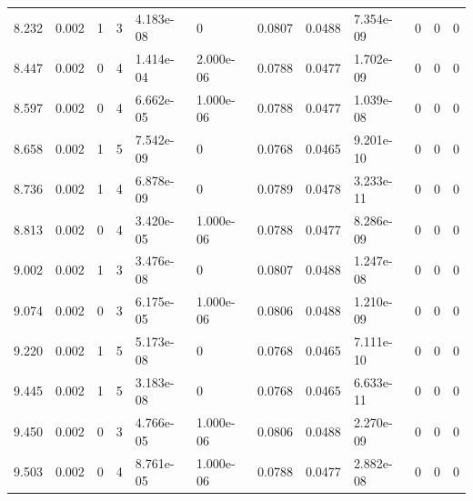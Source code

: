\documentclass[preview]{standalone}
\begin{document}
{{{\begin{tabular}{L{1.2cm}C{1.2cm} C{0.3cm}C{0.5cm} C{1.4cm}C{1.4cm} C{1.4cm}C{1.4cm} C{1.6cm}C{1.6cm} C{1.6cm}C{1.6cm}}
  8.232  &  0.002  & 1     &  3 &  4.183e-08  & 0  &  0.0807&   0.0488& 7.354e-09 & 0   &  0 & 0  \\ 
  8.447  &  0.002  & 0     &  4 &  1.414e-04  & 2.000e-06  &  0.0788&   0.0477& 1.702e-09 & 0   &  0 & 0  \\ 
  8.597  &  0.002  & 0     &  4 &  6.662e-05  & 1.000e-06  &  0.0788&   0.0477& 1.039e-08 & 0   &  0 & 0  \\ 
  8.658  &  0.002  & 1     &  5 &  7.542e-09  & 0  &  0.0768&   0.0465& 9.201e-10 & 0   &  0 & 0  \\ 
  8.736  &  0.002  & 1     &  4 &  6.878e-09  & 0  &  0.0789&   0.0478& 3.233e-11 & 0   &  0 & 0  \\ 
  8.813  &  0.002  & 0     &  4 &  3.420e-05  & 1.000e-06  &  0.0788&   0.0477& 8.286e-09 & 0   &  0 & 0  \\ 
  9.002  &  0.002  & 1     &  3 &  3.476e-08  & 0  &  0.0807&   0.0488& 1.247e-08 & 0   &  0 & 0  \\ 
  9.074  &  0.002  & 0     &  3 &  6.175e-05  & 1.000e-06  &  0.0806&   0.0488& 1.210e-09 & 0   &  0 & 0  \\ 
  9.220  &  0.002  & 1     &  5 &  5.173e-08  & 0  &  0.0768&   0.0465& 7.111e-10 & 0   &  0 & 0  \\ 
  9.445  &  0.002  & 1     &  5 &  3.183e-08  & 0  &  0.0768&   0.0465& 6.633e-11 & 0   &  0 & 0  \\ 
  9.450  &  0.002  & 0     &  3 &  4.766e-05  & 1.000e-06  &  0.0806&   0.0488& 2.270e-09 & 0   &  0 & 0  \\ 
  9.503  &  0.002  & 0     &  4 &  8.761e-05  & 1.000e-06  &  0.0788&   0.0477& 2.882e-08 & 0   &  0 & 0  \\ 
\hline 
\end{tabular} 

}}}
\end{document}
